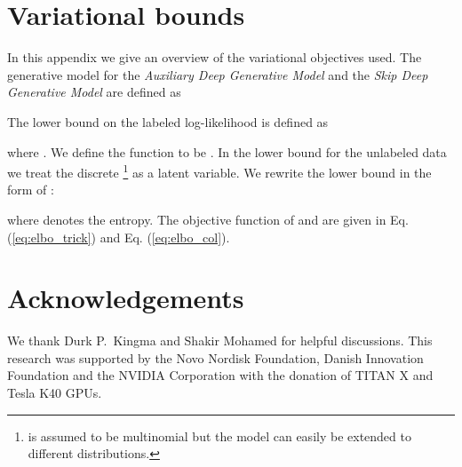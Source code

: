 \documentclass{article}
\begin{document}
\newpage
\section{Variational bounds} \label{app:variational_bounds}
In this appendix we give an overview of the variational objectives used.
The generative model  for the \emph{Auxiliary Deep Generative Model} and the \emph{Skip Deep Generative Model} are defined as

The lower bound  on the labeled log-likelihood is defined as

where . We define the function  to be . In the lower bound for the unlabeled data  we treat the discrete \footnote{ is assumed to be multinomial but the model can easily be extended to different distributions.} as a latent variable. We rewrite the lower bound in the form of \citet{Kingma14}:

where  denotes the entropy. The objective function of  and  are given in Eq. (\ref{eq:elbo_trick}) and Eq. (\ref{eq:elbo_col}). 



\newpage
\section*{Acknowledgements} 
We thank Durk P.\ Kingma and Shakir Mohamed for helpful discussions. This research was supported by the Novo Nordisk Foundation, Danish Innovation Foundation and the NVIDIA Corporation with the donation of TITAN X and Tesla K40 GPUs.



\end{document}
